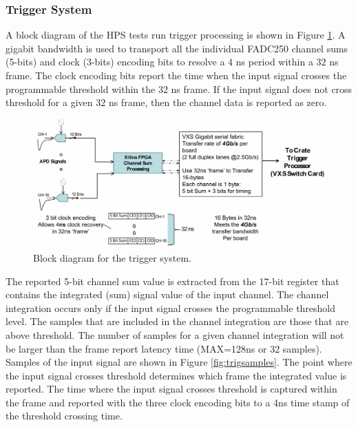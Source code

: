 \subsubsection{Trigger System}
\label{sec:tesrun_trigger}

A block diagram of the HPS tests run trigger processing is shown in Figure \ref{fig:trigger_diagram}.  A gigabit bandwidth is used to transport all the individual FADC250 channel sums (5-bits) and clock (3-bits) encoding bits to resolve a $4$ ns period within a $32$ ns frame.  The clock encoding bits report the time when the input signal crosses the programmable threshold within the $32$ ns frame.  If the input signal does not cross threshold for a given $32$ ns frame, then the channel data is reported as zero.

\begin{figure}[t]
\includegraphics[scale=0.6]{test2012/trigger/HPSChanSum_001.jpg}
\caption{\small{Block diagram for the trigger system.}}\label{fig:trigger_diagram}
\end{figure}

The reported 5-bit channel sum value is extracted from the 17-bit register that contains the integrated (sum) signal value of the input channel.  The channel integration occurs only if the input signal crosses the programmable threshold level.  The samples that are included in the channel integration are those that are above threshold.  The number of samples for a given channel integration will not be larger than the frame report latency time (MAX=128ns or 32 samples). Samples of the input signal are shown in Figure \ref{fig:trigsamples}. The point where the input signal crosses threshold determines which frame the integrated value is reported.  The time where the input signal crosses threshold is captured within the frame and reported with the three clock encoding bits to a 4ns time stamp of the threshold crossing time.

